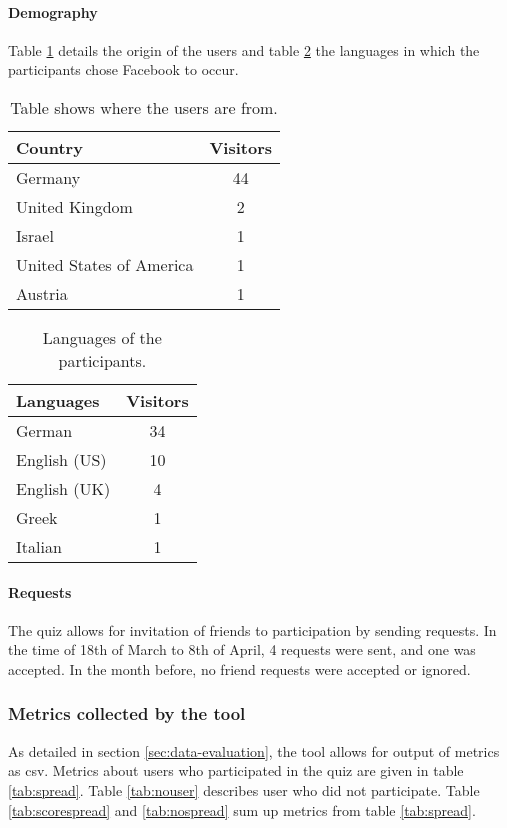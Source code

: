 \documentclass[preprint,12pt]{elsarticle}
\begin{document}
\paragraph{Demography}
\label{sec:demographie}
Table \ref{tab:countries} details the origin of the users and table
\ref{tab:languages} the languages in which the participants chose
Facebook to occur.


\begin{center}
\begin{table}
\label{tab:countries}
\begin{tabular}{l | c }
Country  & Visitors \\
\hline
Germany  & 44 \\
United Kingdom & 2 \\
Israel & 1 \\
United States of America & 1 \\
Austria & 1 \\
\end{tabular}
\caption{Table shows where the users are from.}
\end{table}
\end{center}

\begin{center}
\begin{table}
\label{tab:languages}
\begin{tabular}{l | c }
Languages   & Visitors \\
\hline
German  & 34 \\
English (US) & 10 \\
English (UK) & 4 \\
Greek  & 1 \\
Italian & 1 \\
\end{tabular}
\caption{Languages of the participants.}
\end{table}
\end{center}

\paragraph{Requests}
The quiz allows for invitation of friends to participation by sending
requests. In the time of 18th of March to 8th of April, 4 requests
were sent, and one was accepted. In the month before, no friend
requests were accepted or ignored.

\subsubsection{Metrics collected by the tool}
\label{sec:tool-metrics}
As detailed in section \ref{sec:data-evaluation}, the tool allows for
output of metrics as \ac{csv}. Metrics about users who participated in
the quiz are given in table
\ref{tab:spread}. Table \ref{tab:nouser}
describes user who did not participate. Table \ref{tab:scorespread}
and \ref{tab:nospread} sum up metrics from table \ref{tab:spread}.
\end{document}
